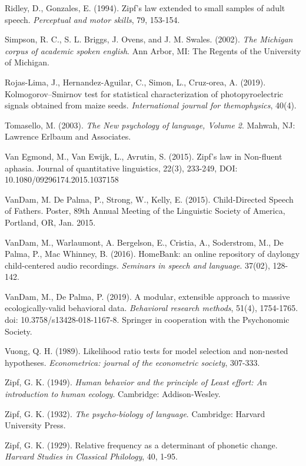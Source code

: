\documentclass[12pt]{article}
\begin{document}
\begin{thebibliography}{50}
Ridley, D., Gonzales, E. (1994). Zipf's law extended to small samples of adult speech.  \emph{Perceptual and motor skills}, 79, 153-154. 

Simpson, R. C., S. L. Briggs, J. Ovens, and J. M. Swales. (2002). \emph{The Michigan corpus of academic spoken english}. Ann Arbor, MI: The Regents of the University of Michigan.

Rojas-Lima, J., Hernandez-Aguilar, C., Simon, L., Cruz-orea, A. (2019). Kolmogorov–Smirnov test for statistical characterization of photopyroelectric signals obtained from maize seeds. \emph{International journal for themophysics}, 40(4).

Tomasello, M. (2003).  \emph{The New psychology of language, Volume 2}. Mahwah, NJ: Lawrence Erlbaum and Associates. 

Van Egmond, M., Van Ewijk, L., Avrutin, S. (2015). Zipf’s law in Non-fluent aphasia. Journal of quantitative linguistics, 22(3), 233-249, DOI:
10.1080/09296174.2015.1037158

VanDam, M.  De Palma, P., Strong, W., Kelly, E. (2015). Child-Directed Speech of Fathers. Poster, 89th Annual Meeting of the Linguistic Society of America, Portland, OR, Jan. 2015.

VanDam, M., Warlaumont, A. Bergelson, E., Cristia, A., Soderstrom, M., De Palma, P., 
Mac Whinney, B.  (2016).  HomeBank: an online repository of daylongy child-centered audio recordings.  \emph{Seminars in speech and language}.  37(02), 128-142.

VanDam, M., De Palma, P. (2019).  A modular, extensible approach to massive ecologically-valid behavioral data.  \emph{Behavioral research methods}, 51(4), 1754-1765. doi: 10.3758/s13428-018-1167-8. Springer in cooperation with the Psychonomic Society. 

Vuong, Q. H. (1989). Likelihood ratio tests for model selection and non-nested hypotheses. \emph{Econometrica: journal of the econometric society}, 307-333.

Zipf, G. K. (1949). \emph{Human behavior and the principle of Least effort: An introduction to human ecology}. Cambridge: Addison-Wesley.

Zipf, G. K. (1932). \emph{The psycho-biology of language}. Cambridge: Harvard University Press. 

Zipf, G. K. (1929). Relative frequency as a determinant of phonetic change. \emph{Harvard Studies in Classical Philology}, 40, 1-95.

\end{thebibliography}
\end{document}
